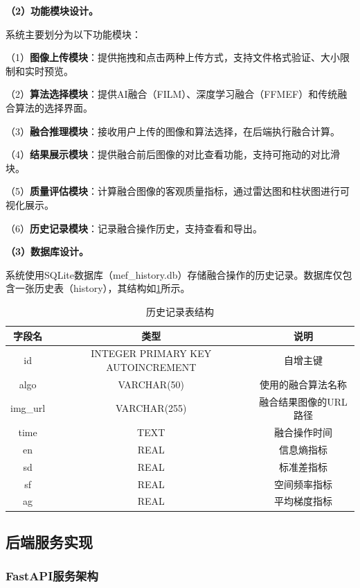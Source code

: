 \textbf{（2）功能模块设计。}

系统主要划分为以下功能模块：

（1）\textbf{图像上传模块}：提供拖拽和点击两种上传方式，支持文件格式验证、大小限制和实时预览。

（2）\textbf{算法选择模块}：提供AI融合（FILM）、深度学习融合（FFMEF）和传统融合算法的选择界面。

（3）\textbf{融合推理模块}：接收用户上传的图像和算法选择，在后端执行融合计算。

（4）\textbf{结果展示模块}：提供融合前后图像的对比查看功能，支持可拖动的对比滑块。

（5）\textbf{质量评估模块}：计算融合图像的客观质量指标，通过雷达图和柱状图进行可视化展示。

（6）\textbf{历史记录模块}：记录融合操作历史，支持查看和导出。

\textbf{（3）数据库设计。}

系统使用SQLite数据库（mef\_history.db）存储融合操作的历史记录。数据库仅包含一张历史表（history），其结构如\cref{tab:db}所示。

\begin{table}[htb!]
    \caption{历史记录表结构}
    \label{tab:db}
    \centering
    \begin{tabular}{ccc}
        \hline
        字段名 & 类型 & 说明 \\
        \hline
        id & INTEGER PRIMARY KEY AUTOINCREMENT & 自增主键 \\
        algo & VARCHAR(50) & 使用的融合算法名称 \\
        img\_url & VARCHAR(255) & 融合结果图像的URL路径 \\
        time & TEXT & 融合操作时间 \\
        en & REAL & 信息熵指标 \\
        sd & REAL & 标准差指标 \\
        sf & REAL & 空间频率指标 \\
        ag & REAL & 平均梯度指标 \\
        \hline
    \end{tabular}
\end{table}

\subsection{后端服务实现}\label{sec:backend}

\subsubsection{FastAPI服务架构}\label{sec:fastapi_arch}

